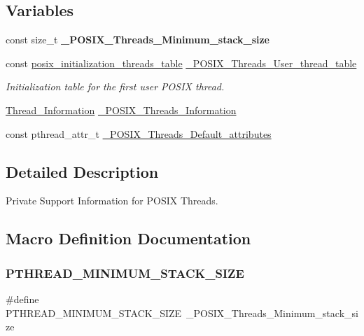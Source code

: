 \subsection*{Variables}
\begin{DoxyCompactItemize}
\item 
\mbox{\label{group__POSIX__PTHREAD_ga116ea4cf4c3ffa79015c04e3a2d3497c}} 
const size\+\_\+t {\bfseries \+\_\+\+P\+O\+S\+I\+X\+\_\+\+Threads\+\_\+\+Minimum\+\_\+stack\+\_\+size}
\item 
const \mbox{\hyperlink{structposix__initialization__threads__table}{posix\+\_\+initialization\+\_\+threads\+\_\+table}} \mbox{\hyperlink{group__POSIX__PTHREAD_ga096d9da086e4a4519e8383da4fb4921d}{\+\_\+\+P\+O\+S\+I\+X\+\_\+\+Threads\+\_\+\+User\+\_\+thread\+\_\+table}}
\begin{DoxyCompactList}\small\item\em Initialization table for the first user P\+O\+S\+IX thread. \end{DoxyCompactList}\item 
\mbox{\hyperlink{structThread__Information}{Thread\+\_\+\+Information}} \mbox{\hyperlink{group__POSIX__PTHREAD_ga1d9814955c385da84ecea90c53f13b9d}{\+\_\+\+P\+O\+S\+I\+X\+\_\+\+Threads\+\_\+\+Information}}
\item 
const pthread\+\_\+attr\+\_\+t \mbox{\hyperlink{group__POSIX__PTHREAD_ga69d621e65d4702ab09490f48d8588fd4}{\+\_\+\+P\+O\+S\+I\+X\+\_\+\+Threads\+\_\+\+Default\+\_\+attributes}}
\end{DoxyCompactItemize}


\subsection{Detailed Description}
Private Support Information for P\+O\+S\+IX Threads. 



\subsection{Macro Definition Documentation}
\mbox{\label{group__POSIX__PTHREAD_ga804186032828ea474e2bfcba090c9bef}} 
\subsubsection{\texorpdfstring{PTHREAD\_MINIMUM\_STACK\_SIZE}{PTHREAD\_MINIMUM\_STACK\_SIZE}}
{\footnotesize\ttfamily \#define P\+T\+H\+R\+E\+A\+D\+\_\+\+M\+I\+N\+I\+M\+U\+M\+\_\+\+S\+T\+A\+C\+K\+\_\+\+S\+I\+ZE~\+\_\+\+P\+O\+S\+I\+X\+\_\+\+Threads\+\_\+\+Minimum\+\_\+stack\+\_\+size}

